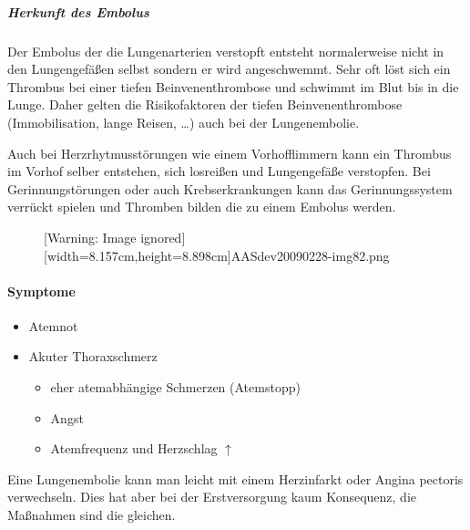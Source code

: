 \subparagraph*{Herkunft des Embolus}

Der Embolus der die Lungenarterien verstopft entsteht
normalerweise nicht in den Lungengefäßen selbst sondern er
wird angeschwemmt. Sehr oft löst sich ein Thrombus bei
einer tiefen Beinvenenthrombose und schwimmt im Blut bis in
die Lunge. Daher gelten die
Risikofaktoren der tiefen Beinvenenthrombose
(Immobilisation, lange Reisen, \ldots) auch bei der
Lungenembolie. 

Auch bei Herzrhytmusstörungen wie einem
Vorhofflimmern kann ein Thrombus im Vorhof selber entstehen, 
sich losreißen und Lungengefäße verstopfen. Bei
Gerinnungstörungen oder auch Krebserkrankungen kann das
Gerinnungssystem verrückt spielen und Thromben bilden die
zu einem Embolus werden.

\begin{figure}[hb]
    \caption{[Warning: Image ignored] [width=8.157cm,height=8.898cm]{AASdev20090228-img82.png}}
\end{figure}

\paragraph{Symptome}

\begin{itemize}
    \item Atemnot
    \item Akuter Thoraxschmerz
    \begin{itemize}
        \item eher atemabhängige Schmerzen (Atemstopp)
    \end{itemize}
    \begin{itemize}
        \item Angst
        \item Atemfrequenz und Herzschlag ${\uparrow}$
    \end{itemize}
\end{itemize}

Eine Lungenembolie kann man leicht mit einem Herzinfarkt oder Angina
pectoris verwechseln. Dies hat aber bei der Erstversorgung kaum
Konsequenz, die Ma{\ss}nahmen sind die gleichen.


